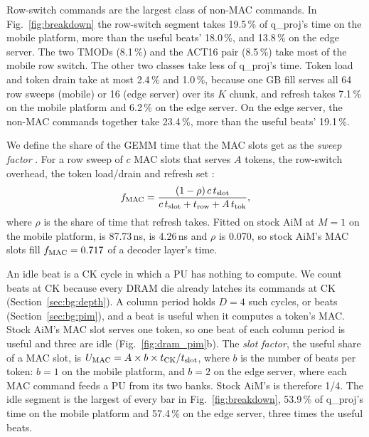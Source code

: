 Row-switch commands are the largest class of non-MAC commands. In Fig.~\ref{fig:breakdown} the row-switch segment
takes 19.5\,\% of q\_proj's time on the mobile platform, more than the useful beats' 18.0\,\%, and 13.8\,\% on the edge
server. The two TMODs (8.1\,\%) and the ACT16 pair (8.5\,\%) take most of the mobile row
switch. The other two classes take less of q\_proj's time. Token load and token drain take at most 2.4\,\% and
1.0\,\%, because one GB fill serves all 64 row sweeps (mobile) or 16 (edge server) over its $K$ chunk, and refresh
takes 7.1\,\% on the mobile platform and 6.2\,\% on the edge server. On the edge server, the non-MAC commands together
take 23.4\,\%, more than the useful beats' 19.1\,\%.

We define the share of the GEMM time that the MAC slots get as the \emph{sweep factor} \fMAC. For a row sweep of
$c$ MAC slots that serves $A$ tokens, the row-switch overhead, the token load/drain and refresh set \fMAC:
\begin{equation}
  \fMAC = \frac{(1 - \rho)\, c\, \tslot}{c\, \tslot + \trow + A\, \ttok}, \label{eq:fmac}
\end{equation}
where $\rho$ is the share of time that refresh takes. Fitted on stock AiM at $M = 1$ on the mobile platform, \trow
is 87.73\,ns, \ttok is 4.26\,ns and $\rho$ is 0.070, so stock AiM's MAC slots fill $\fMAC = 0.717$ of a decoder layer's
time.

An idle beat is a CK cycle in which a PU has nothing to compute. We count beats at CK because every DRAM die already
latches its commands at CK (Section~\ref{sec:bg:depth}). A column period holds $D = 4$ such cycles, or beats
(Section~\ref{sec:bg:pim}), and a beat is useful when it computes a token's MAC. Stock AiM's MAC slot serves one token,
so one beat of each column period is useful and three are idle (Fig.~\ref{fig:dram_pim}b). The \emph{slot factor},
the useful share of a MAC slot, is $\UMAC = A \times b \times \tck / \tslot$, where $b$ is the number of beats per
token: $b = 1$ on the mobile platform, and $b = 2$ on the edge server, where each MAC command feeds a PU from its two
banks. Stock AiM's \UMAC is therefore 1/4. The idle segment is the largest of every bar in Fig.~\ref{fig:breakdown},
53.9\,\% of q\_proj's time on the mobile platform and 57.4\,\% on the edge server, three times the useful beats.

